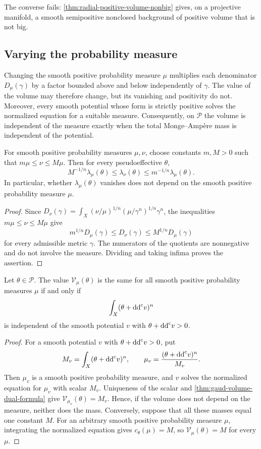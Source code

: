 The converse fails: \cref{thm:radial-positive-volume-nonbig} gives, on a projective manifold, a smooth semipositive nonclosed background of positive volume that is not big.

\subsection{Varying the probability measure}

Changing the smooth positive probability measure $\mu$ multiplies each denominator $D_\mu(\gamma)$ by a factor bounded above and below independently of $\gamma$. The value of the volume may therefore change, but its vanishing and positivity do not. Moreover, every smooth potential whose form is strictly positive solves the normalized equation for a suitable measure. Consequently, on $\mathscr P$ the volume is independent of the measure exactly when the total Monge--Amp\`ere mass is independent of the potential.

\begin{proposition}\label{prop:gaud-volume-density-comparison}
For smooth positive probability measures $\mu,\nu$, choose constants $m,M>0$ such that $m\mu\leq\nu\leq M\mu$. Then for every pseudoeffective $\theta$,
\[
 M^{-1/n}\lambda_\mu(\theta)
 \leq\lambda_\nu(\theta)
 \leq m^{-1/n}\lambda_\mu(\theta).
\]
In particular, whether $\lambda_\mu(\theta)$ vanishes does not depend on the smooth positive probability measure $\mu$.
\end{proposition}
\begin{proof}
Since $D_\nu(\gamma)=\int_X(\nu/\mu)^{1/n}(\mu/\gamma^n)^{1/n}\gamma^n$, the inequalities $m\mu\leq\nu\leq M\mu$ give
\[
 m^{1/n}D_\mu(\gamma)\leq D_\nu(\gamma)\leq M^{1/n}D_\mu(\gamma)
\]
for every admissible metric $\gamma$. The numerators of the quotients are nonnegative and do not involve the measure. Dividing and taking infima proves the assertion.
\end{proof}

\begin{proposition}\label{prop:gaud-volume-density-independence}
Let $\theta\in\mathscr P$. The value $\mathcal V_\mu(\theta)$ is the same for all smooth positive probability measures $\mu$ if and only if
\[
 \int_X(\theta+\mathrm{dd}^{\mathrm{c}} v)^n
\]
is independent of the smooth potential $v$ with $\theta+\mathrm{dd}^{\mathrm{c}} v>0$.
\end{proposition}
\begin{proof}
For a smooth potential $v$ with $\theta+\mathrm{dd}^{\mathrm{c}} v>0$, put
\[
 M_v=\int_X(\theta+\mathrm{dd}^{\mathrm{c}} v)^n,
 \qquad \mu_v=\frac{(\theta+\mathrm{dd}^{\mathrm{c}} v)^n}{M_v}.
\]
Then $\mu_v$ is a smooth positive probability measure, and $v$ solves the normalized equation for $\mu_v$ with scalar $M_v$. Uniqueness of the scalar and \cref{thm:gaud-volume-dual-formula} give $\mathcal V_{\mu_v}(\theta)=M_v$. Hence, if the volume does not depend on the measure, neither does the mass. Conversely, suppose that all these masses equal one constant $M$. For an arbitrary smooth positive probability measure $\mu$, integrating the normalized equation gives $c_\theta(\mu)=M$, so $\mathcal V_\mu(\theta)=M$ for every $\mu$.
\end{proof}

